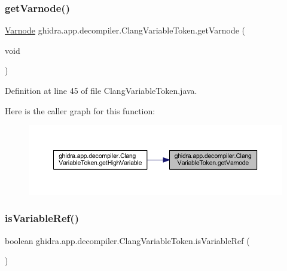 \subsubsection{\texorpdfstring{getVarnode()}{getVarnode()}}
{\footnotesize\ttfamily \mbox{\hyperlink{class_varnode}{Varnode}} ghidra.\+app.\+decompiler.\+Clang\+Variable\+Token.\+get\+Varnode (\begin{DoxyParamCaption}\item[{void}]{ }\end{DoxyParamCaption})\hspace{0.3cm}{\ttfamily [inline]}}



Definition at line 45 of file Clang\+Variable\+Token.\+java.

Here is the caller graph for this function\+:
\nopagebreak
\begin{figure}[H]
\begin{center}
\leavevmode
\includegraphics[width=350pt]{classghidra_1_1app_1_1decompiler_1_1_clang_variable_token_a1ca7e13dba091811591ea0b8058b1d71_icgraph}
\end{center}
\end{figure}
\mbox{\label{classghidra_1_1app_1_1decompiler_1_1_clang_variable_token_a6ae3f8956567cd8cc5b18bf8e0238d70}} 
\subsubsection{\texorpdfstring{isVariableRef()}{isVariableRef()}}
{\footnotesize\ttfamily boolean ghidra.\+app.\+decompiler.\+Clang\+Variable\+Token.\+is\+Variable\+Ref (\begin{DoxyParamCaption}{ }\end{DoxyParamCaption})\hspace{0.3cm}{\ttfamily [inline]}}




